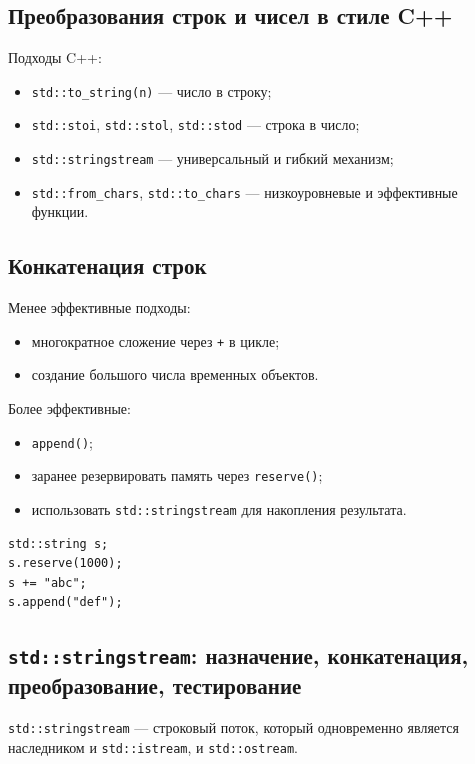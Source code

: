 \subsection{Преобразования строк и чисел в стиле C++}
Подходы C++:
\begin{itemize}
    \item \texttt{std::to\_string(n)} — число в строку;
    \item \texttt{std::stoi}, \texttt{std::stol}, \texttt{std::stod} — строка в число;
    \item \texttt{std::stringstream} — универсальный и гибкий механизм;
    \item \texttt{std::from\_chars}, \texttt{std::to\_chars} — низкоуровневые и эффективные функции.
\end{itemize}

\subsection{Конкатенация строк}
Менее эффективные подходы:
\begin{itemize}
    \item многократное сложение через \texttt{+} в цикле;
    \item создание большого числа временных объектов.
\end{itemize}

Более эффективные:
\begin{itemize}
    \item \texttt{append()};
    \item заранее резервировать память через \texttt{reserve()};
    \item использовать \texttt{std::stringstream} для накопления результата.
\end{itemize}

\begin{example}
\begin{verbatim}
std::string s;
s.reserve(1000);
s += "abc";
s.append("def");
\end{verbatim}
\end{example}

\subsection{\texttt{std::stringstream}: назначение, конкатенация, преобразование, тестирование}
\begin{definition}
\texttt{std::stringstream} — строковый поток, который одновременно является наследником и \texttt{std::istream}, и \texttt{std::ostream}.
\end{definition}

